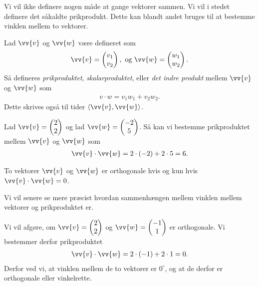 Vi vil ikke definere nogen måde at gange vektorer sammen. Vi vil i stedet definere det såkaldte prikprodukt. Dette kan blandt andet bruges til at bestemme vinklen mellem to vektorer. 
\begin{defn}
Lad $\vv{v}$ og $\vv{w}$ være defineret som
\begin{align*}
\vv{v} = \begin{pmatrix}
v_1\\ v_2
\end{pmatrix}, \textnormal{ og }\vv{w} = \begin{pmatrix}w_1 \\ w_2
\end{pmatrix}.
\end{align*}
Så defineres \textit{prikproduktet}, \textit{skalarproduktet}, eller \textit{det indre produkt}  mellem $\vv{v}$ og $\vv{w}$ som
\begin{align*}
v\cdot w = v_1w_1 + v_2w_2.
\end{align*}
Dette skrives også til tider $\langle \vv{v}, \vv{w} \rangle$. 
\end{defn}
\begin{exa}
Lad $\vv{v} = \begin{pmatrix}
2 \\ 2
\end{pmatrix}$ og lad $\vv{w} = \begin{pmatrix}
-2 \\ 5
\end{pmatrix}$. Så kan vi bestemme prikproduktet mellem $\vv{v}$ og $\vv{w}$ som
\begin{align*}
\vv{v} \cdot \vv{w} = 2\cdot(-2)+2\cdot 5 = 6.
\end{align*}
\end{exa}

\begin{setn}\label{setn:1}
To vektorer $\vv{v}$ og $\vv{w}$ er orthogonale hvis og kun hvis $\vv{v}\cdot \vv{w} = 0$.
\end{setn}
Vi vil senere se mere præcist hvordan sammenhængen mellem vinklen mellem vektorer og prikproduktet er. 
\begin{exa}
Vi vil afgøre, om $\vv{v} = \begin{pmatrix}
2\\2
\end{pmatrix}$ og $\vv{w} = \begin{pmatrix}
-1\\1
\end{pmatrix}$ er orthogonale. Vi bestemmer derfor prikproduktet
\begin{align*}
\vv{v}\cdot \vv{w} = 2\cdot(-1)+2\cdot 1 = 0. 
\end{align*}
Derfor ved vi, at vinklen mellem de to vektorer er $0^\circ$, og at de derfor er orthogonale eller vinkelrette.
\end{exa}

